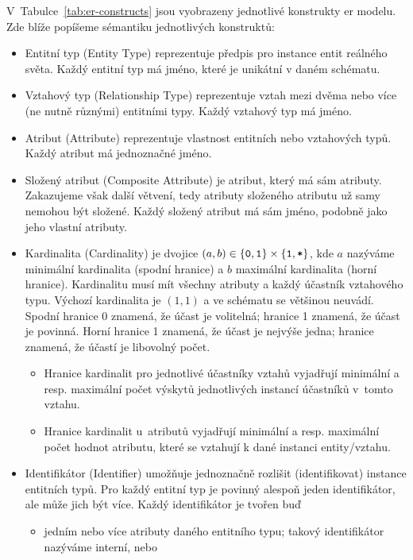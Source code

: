 V~Tabulce~\ref{tab:er-constructs} jsou vyobrazeny jednotlivé konstrukty \acrshort{er} modelu.
Zde blíže popíšeme sémantiku jednotlivých konstruktů:
\begin{itemize}
  \item Entitní typ (Entity Type) reprezentuje předpis pro instance entit reálného světa.
        Každý entitní typ má jméno, které je unikátní v daném schématu.
  \item Vztahový typ (Relationship Type) reprezentuje vztah mezi dvěma nebo více (ne nutně různými) entitními typy.
        Každý vztahový typ má jméno.
  \item Atribut (Attribute) reprezentuje vlastnost entitních nebo vztahových typů.
        Každý atribut má jednoznačné jméno.
  \item Složený atribut (Composite Attribute) je atribut, který má sám atributy.
        Zakazujeme však další větvení, tedy atributy složeného atributu už samy nemohou být složené.
        Každý složený atribut má sám jméno, podobně jako jeho vlastní atributy.
  \item \label{def:cardinality}Kardinalita (Cardinality) je dvojice $(a, b) \in \left\{\texttt{0}, \texttt{1}\right\}\times \left\{\texttt{1}, \texttt{*}\right\}$, kde $a$ nazýváme minimální kardinalita (spodní hranice) a $b$ maximální kardinalita (horní hranice).
        Kardinalitu musí mít všechny atributy a každý účastník vztahového typu.
        Výchozí kardinalita je $(1, 1)$ a ve schématu se většinou neuvádí.
        Spodní hranice 0 znamená, že účast je volitelná; hranice 1 znamená, že účast je povinná.
        Horní hranice 1 znamená, že účast je nejvýše jedna; hranice~\many{} znamená, že účastí je libovolný počet.
        \begin{itemize}
          \item Hranice kardinalit pro jednotlivé účastníky vztahů vyjadřují minimální a resp. maximální počet výskytů jednotlivých instancí účastníků v~tomto vztahu.
          \item Hranice kardinalit u~atributů vyjadřují minimální a resp. maximální počet hodnot atributu, které se vztahují k dané instanci entity/vztahu.
        \end{itemize}
  \item Identifikátor (Identifier) umožňuje jednoznačně rozlišit (identifikovat) instance entitních typů.
        Pro každý entitní typ je povinný alespoň jeden identifikátor, ale může jich být více.
        Každý identifikátor je tvořen buď
        \begin{itemize}
          \item jedním nebo více atributy daného entitního typu; takový identifikátor nazýváme interní, nebo

\end{itemize}
\end{itemize}
